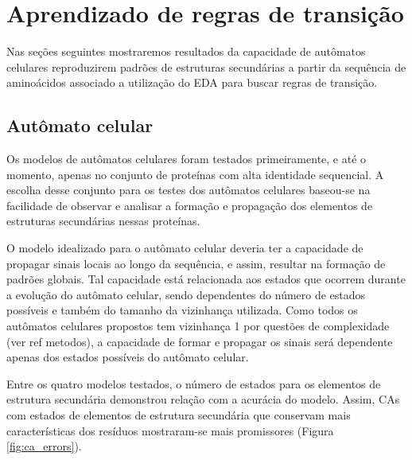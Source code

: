 \chapter{Aprendizado de regras de transição}

Nas seções seguintes mostraremos resultados da capacidade de autômatos celulares reproduzirem padrões de estruturas secundárias a partir da sequência de aminoácidos associado a utilização do EDA para buscar regras de transição. 


\section{Autômato celular}

Os modelos de autômatos celulares foram testados primeiramente, e até o momento, apenas no conjunto de proteínas com alta identidade sequencial. A escolha desse conjunto para os testes dos autômatos celulares baseou-se na facilidade de observar e analisar a formação e propagação dos elementos de estruturas secundárias nessas proteínas.

O modelo idealizado para o autômato celular deveria ter a capacidade de propagar sinais locais ao longo da sequência, e assim, resultar na formação de padrões globais. Tal capacidade está relacionada aos estados que ocorrem durante a evolução do autômato celular, sendo dependentes do número de estados possíveis e também do tamanho da vizinhança utilizada. Como todos os autômatos celulares propostos tem vizinhança 1 por questões de complexidade (ver ref metodos), a capacidade de formar e propagar os sinais será dependente apenas dos estados possíveis do autômato celular.

Entre os quatro modelos testados, o número de estados para os elementos de estrutura secundária demonstrou relação com a acurácia do modelo. Assim, CAs com estados de elementos de estrutura secundária que conservam mais características dos resíduos mostraram-se mais promissores (Figura \ref{fig:ca_errors}).

